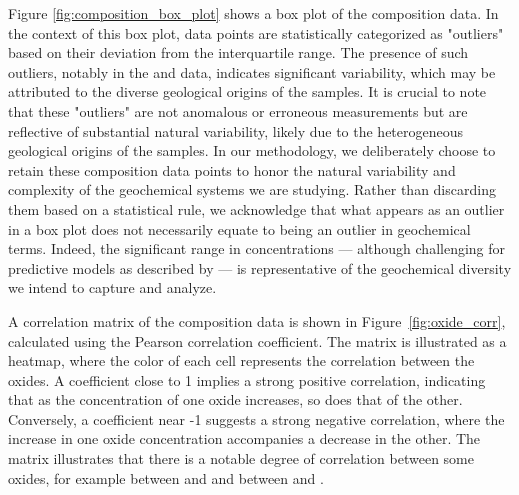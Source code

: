 Figure \ref{fig:composition_box_plot} shows a box plot of the composition data.
In the context of this box plot, data points are statistically categorized as "outliers" based on their deviation from the interquartile range.
The presence of such outliers, notably in the  and  data, indicates significant variability, which may be attributed to the diverse geological origins of the samples.
It is crucial to note that these "outliers" are not anomalous or erroneous measurements but are reflective of substantial natural variability, likely due to the heterogeneous geological origins of the samples.
In our methodology, we deliberately choose to retain these composition data points to honor the natural variability and complexity of the geochemical systems we are studying.
Rather than discarding them based on a statistical rule, we acknowledge that what appears as an outlier in a box plot does not necessarily equate to being an outlier in geochemical terms.
Indeed, the significant range in  concentrations --- although challenging for predictive models as described by \citet{cleggRecalibrationMarsScience2017} --- is representative of the geochemical diversity we intend to capture and analyze.

A correlation matrix of the composition data is shown in Figure~\ref{fig:oxide_corr}, calculated using the Pearson correlation coefficient.
The matrix is illustrated as a heatmap, where the color of each cell represents the correlation between the oxides.
A coefficient close to 1 implies a strong positive correlation, indicating that as the concentration of one oxide increases, so does that of the other.
Conversely, a coefficient near -1 suggests a strong negative correlation, where the increase in one oxide concentration accompanies a decrease in the other.
The matrix illustrates that there is a notable degree of correlation between some oxides, for example between  and  and between  and .
